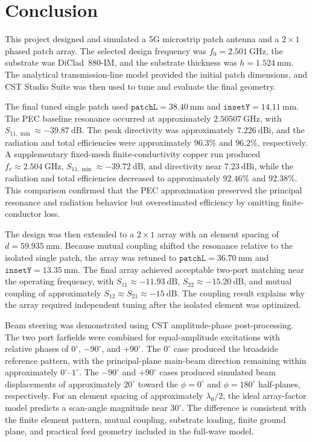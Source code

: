 \section{Conclusion}
\label{sec:conclusion}

This project designed and simulated a 5G microstrip patch antenna and a \(2\times1\) phased patch
array. The selected design frequency was \(f_0=2.501~\mathrm{GHz}\), the substrate was
DiClad~880-IM, and the substrate thickness was \(h=1.524~\mathrm{mm}\). The analytical
transmission-line model provided the initial patch dimensions, and CST Studio Suite was then used
to tune and evaluate the final geometry.

The final tuned single patch used \(\texttt{patchL}=38.40~\mathrm{mm}\) and
\(\texttt{insetY}=14.11~\mathrm{mm}\). The PEC baseline resonance occurred at approximately
\(2.50507~\mathrm{GHz}\), with \(S_{11,\min}\approx-39.87~\mathrm{dB}\). The peak
directivity was approximately \(7.226~\mathrm{dBi}\), and the radiation and total efficiencies
were approximately \(96.3\%\) and \(96.2\%\), respectively. A supplementary fixed-mesh
finite-conductivity copper run produced \(f_r\approx2.504~\mathrm{GHz}\),
\(S_{11,\min}\approx-39.72~\mathrm{dB}\), and directivity near \(7.23~\mathrm{dBi}\), while
the radiation and total efficiencies decreased to approximately \(92.46\%\) and \(92.38\%\).
This comparison confirmed that the PEC approximation preserved the principal resonance and
radiation behavior but overestimated efficiency by omitting finite-conductor loss.

The design was then extended to a \(2\times1\) array with an element spacing of
\(d=59.935~\mathrm{mm}\). Because mutual coupling shifted the resonance relative to the isolated
single patch, the array was retuned to \(\texttt{patchL}=36.70~\mathrm{mm}\) and
\(\texttt{insetY}=13.35~\mathrm{mm}\). The final array achieved acceptable two-port matching
near the operating frequency, with \(S_{11}\approx-11.93~\mathrm{dB}\),
\(S_{22}\approx-15.20~\mathrm{dB}\), and mutual coupling of approximately
\(S_{12}\approx S_{21}\approx-15~\mathrm{dB}\). The coupling result explains why the array
required independent tuning after the isolated element was optimized.

Beam steering was demonstrated using CST amplitude-phase post-processing. The two port farfields
were combined for equal-amplitude excitations with relative phases of \(0^\circ\), \(-90^\circ\),
and \(+90^\circ\). The \(0^\circ\) case produced the broadside reference pattern, with the
principal-plane main-beam direction remaining within approximately \(0^\circ\)--\(1^\circ\).
The \(-90^\circ\) and \(+90^\circ\) cases produced simulated beam displacements of
approximately \(20^\circ\) toward the \(\phi=0^\circ\) and \(\phi=180^\circ\) half-planes,
respectively. For an element spacing of approximately \(\lambda_0/2\), the ideal array-factor
model predicts a scan-angle magnitude near \(30^\circ\). The difference is consistent with the
finite element pattern, mutual coupling, substrate loading, finite ground plane, and practical feed
geometry included in the full-wave model.

